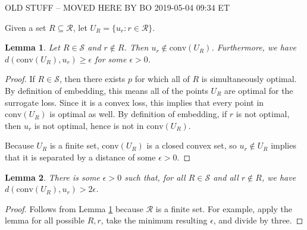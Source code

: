 \documentclass{article}
\newcommand{\Comments}{1}
\newcommand{\mynote}[2]{\ifnum\Comments=1\textcolor{#1}{#2}\fi}
\newcommand{\bo}[1]{\mynote{blue}{[Bo: #1]}}
\newcommand{\R}{\mathcal{R}}
\newcommand{\conv}{\mathrm{conv}}
\newtheorem{lemma}{Lemma}
\begin{document}

\break

{\large OLD STUFF -- MOVED HERE BY BO 2019-05-04 09:34 ET}

Given a set $R \subseteq \R$, let $U_R = \{u_r : r \in \R\}$.

\begin{lemma} \label{lemma:conv-R-no-contain}
  Let $R \in \mathcal{S}$ and $r \not\in R$.
  Then $u_r \not\in \conv(U_R)$.
  Furthermore, we have $d(\conv(U_R), u_r) \geq \epsilon$ for some $\epsilon > 0$.
\end{lemma}
\begin{proof}
  If $R \in \mathcal{S}$, then there exists $p$ for which all of $R$ is simultaneously optimal.
  By definition of embedding, this means all of the points $U_R$ are optimal for the surrogate loss.
  Since it is a convex loss, this implies that every point in $\conv(U_R)$ is optimal as well.
  By definition of embedding, if $r$ is not optimal, then $u_r$ is not optimal, hence is not in $\conv(U_R)$.

  Because $U_R$ is a finite set, $\conv(U_R)$ is a closed convex set, so $u_r \not\in U_R$ implies that it is separated by a distance of some $\epsilon > 0$.
\end{proof}

\begin{lemma} \label{lemma:conv-R-min-eps}
  There is some $\epsilon > 0$ such that, for all $R \in \mathcal{S}$ and all $r \not\in R$, we have $d(\conv(U_R), u_r) > 2\epsilon$.
\end{lemma}
\begin{proof}
  Follows from Lemma \ref{lemma:conv-R-no-contain} because $\R$ is a finite set. For example, apply the lemma for all possible $R,r$, take the minimum resulting $\epsilon$, and divide by three.
\end{proof}

%
\end{document}
